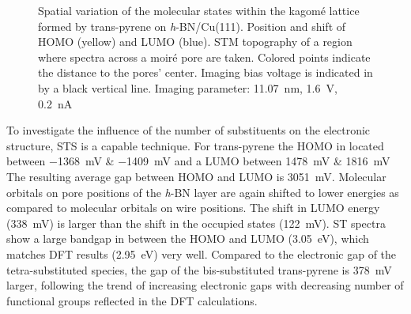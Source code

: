 \begin{figure}[] \centering
	
	\caption{Spatial variation of the molecular states within the kagom\'e lattice formed by trans-pyrene on \textit{h}-BN/Cu(111).  Position and shift of HOMO (yellow) and LUMO (blue).  STM topography of a region where spectra across a moir\'e pore are taken. Colored points indicate the distance to the pores’ center. Imaging bias voltage is indicated in  by a black vertical line. Imaging parameter: \SI{11.07}{\nano \meter}, \SI{1.6}{\volt}, \SI{0.2}{\nano \ampere}
	}
	\label{fig:pyrene-fig6}
\end{figure}

To investigate the influence of the number of substituents on the electronic structure, STS is a capable technique. For trans-pyrene the HOMO in located between 
\SI{-1368}{\milli \volt} \& \SI{-1409}{\milli \volt}
and a LUMO between 
\SI{1478}{\milli \volt} \& \SI{1816}{\milli \volt}
 The resulting average gap between HOMO and LUMO is \SI{3051}{\milli \volt}. Molecular orbitals on pore positions of the \textit{h}-BN layer are again shifted to lower energies as compared to molecular orbitals on wire positions. The shift in LUMO energy (\SI{338}{\milli \volt}) is larger than the shift in the occupied states (\SI{122}{\milli \volt}). 
ST spectra show a large bandgap in between the HOMO and LUMO (\SI{3.05}{\eV}), which matches DFT results (\SI{2.95}{\eV}) very well. Compared to the electronic gap of the tetra-substituted species, the gap of the bis-substituted trans-pyrene is \SI{378}{\milli \volt} larger, following the trend of increasing electronic gaps with decreasing number of functional groups reflected in the DFT calculations.

